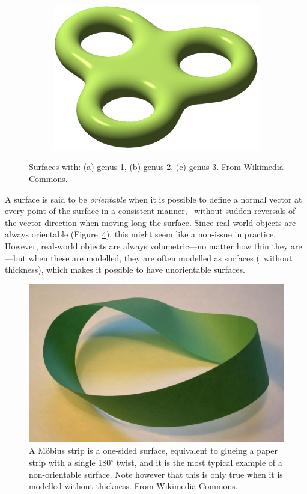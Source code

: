 \begin{figure}
\begin{subfigure}[b]{0.3\linewidth}
\caption{}%
\label{subfig:genus2}
\end{subfigure}
\quad
\begin{subfigure}[b]{0.3\linewidth}
\includegraphics[width=\linewidth]{figs/genus3}
\caption{}%
\label{subfig:genus3}
\end{subfigure}
\caption{Surfaces with: (a) genus 1, (b) genus 2, (c) genus 3. From Wikimedia Commons.}%
\label{fig:genus}
\end{figure}

A surface is said to be \emph{orientable} when it is possible to define a normal vector at every point of the surface in a consistent manner, \ie\ without sudden reversals of the vector direction when moving long the surface.
Since real-world objects are always orientable (Figure~\ref{fig:mobius}), this might seem like a non-issue in practice.
However, real-world objects are always volumetric---no matter how thin they are---but when these are modelled, they are often modelled as surfaces (\ie\ without thickness), which makes it possible to have unorientable surfaces.

\begin{figure}
\centering
\includegraphics[width=0.6\linewidth]{figs/mobius}
\caption{A M\"obius strip is a one-sided surface, equivalent to glueing a paper strip with a single 180\(^\circ\) twist, and it is the most typical example of a non-orientable surface. Note however that this is only true when it is modelled without thickness. From Wikimedia Commons.}%
\label{fig:mobius}
\end{figure}

